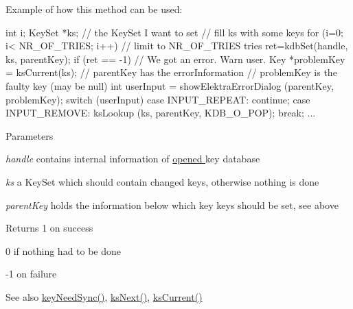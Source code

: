 \begin{DoxyParagraph}{Example of how this method can be used:}

\begin{DoxyCode}
int i;
KeySet *ks;  // the KeySet I want to set
// fill ks with some keys
for (i=0; i< NR_OF_TRIES; i++) // limit to NR_OF_TRIES tries
{
        ret=kdbSet(handle, ks, parentKey);
        if (ret == -1)
        {
                // We got an error. Warn user.
                Key *problemKey = ksCurrent(ks);
                // parentKey has the errorInformation
                // problemKey is the faulty key (may be null)
                int userInput = showElektraErrorDialog (parentKey, problemKey);
                switch (userInput)
                {
                case INPUT_REPEAT: continue;
                case INPUT_REMOVE: ksLookup (ks, parentKey, KDB_O_POP); break;
                ...
                }
        }
}
\end{DoxyCode}

\end{DoxyParagraph}

\begin{DoxyParams}{Parameters}
\item[{\em handle}]contains internal information of \hyperlink{group__kdb_ga6808defe5870f328dd17910aacbdc6ca}{opened } key database \item[{\em ks}]a KeySet which should contain changed keys, otherwise nothing is done \item[{\em parentKey}]holds the information below which key keys should be set, see above \end{DoxyParams}
\begin{DoxyReturn}{Returns}
1 on success 

0 if nothing had to be done 

-\/1 on failure 
\end{DoxyReturn}
\begin{DoxySeeAlso}{See also}
\hyperlink{group__keytest_gaf247df0de7aca04b32ef80e39ef12950}{keyNeedSync()}, \hyperlink{group__keyset_ga317321c9065b5a4b3e33fe1c399bcec9}{ksNext()}, \hyperlink{group__keyset_ga4287b9416912c5f2ab9c195cb74fb094}{ksCurrent()} 
\end{DoxySeeAlso}
